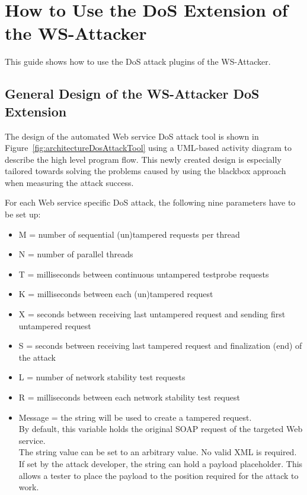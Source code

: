 \section[DoS Extension]{How to Use the DoS Extension of the WS-Attacker}
\label{sec:how_to_use_dos_extension}

This guide shows how to use the DoS attack plugins of the WS-Attacker.

\subsection{General Design of the WS-Attacker DoS Extension}
\label{sec:design_DoS_extension}

The design of the automated Web service DoS attack tool is shown in Figure~\ref{fig:architectureDosAttackTool} using a UML-based activity diagram to describe the high level program flow.
This newly created design is especially tailored towards solving the problems caused by using the blackbox approach when measuring the attack success.\newline

For each Web service specific DoS attack, the following nine parameters have to be set up:
\begin{itemize}
  \item M = number of sequential (un)tampered requests per thread 
  \item N = number of parallel threads 
  \item T = milliseconds between continuous untampered testprobe requests
  \item K = milliseconds between each (un)tampered request 
  \item X = seconds between receiving last untampered request and sending first untampered request 
  \item S = seconds between receiving last tampered request and finalization (end) of the attack 
  \item L = number of network stability test requests
  \item R = milliseconds between each network stability test request 
  \item Message = the string will be used to create a tampered request.\\
  By default, this variable holds the original SOAP request of the targeted Web service.\\
  The string value can be set to an arbitrary value. No valid XML is required.\\
  If set by the attack developer, the string can hold a payload placeholder. This allows a tester to place the payload to the position required for the attack to work.
\end{itemize}

